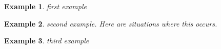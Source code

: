 \documentclass[12pt]{article}
\newtheorem{example}{Example}
\begin{document}
\begin{example} first example
\end{example}

\begin{example} second example. Here are situations where this occurs.
\end{example}



\begin{example} third example
\end{example}
\end{document}
